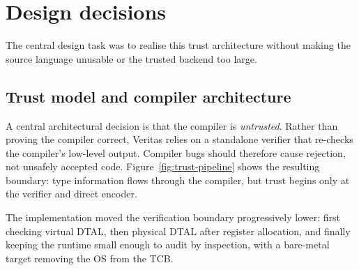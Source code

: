 \section{Design decisions}\label{sec:design-decisions}

The central design task was to realise this trust architecture without making the source language unusable or the trusted backend too large.

\subsection{Trust model and compiler architecture}

A central architectural decision is that the compiler is \textit{untrusted}. Rather than proving the compiler correct, Veritas relies on a standalone verifier that re-checks the compiler's low-level output. Compiler bugs should therefore cause rejection, not unsafely accepted code. Figure~\ref{fig:trust-pipeline} shows the resulting boundary: type information flows through the compiler, but trust begins only at the verifier and direct encoder.

The implementation moved the verification boundary progressively lower: first checking virtual DTAL, then physical DTAL after register allocation, and finally keeping the runtime small enough to audit by inspection, with a bare-metal target removing the OS from the TCB.

